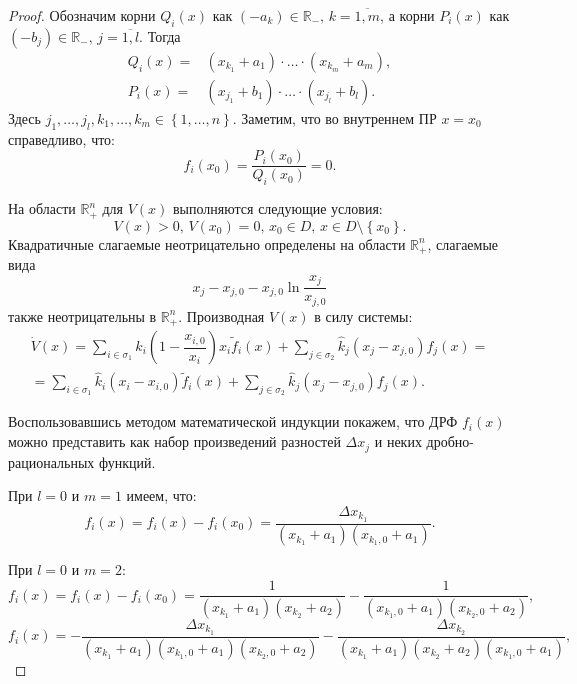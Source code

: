\documentclass[14pt,a4paper]{extarticle}
\begin{document}
	\begin{proof}
		Обозначим корни $Q_i(x)$ как $(-a_k)\in\mathbb{R}_{-},\, k=\overline{1,m}$, а корни $P_i(x)$ как $(-b_j)\in\mathbb{R}_{-},\, j=\overline{1,l}$. Тогда
		\begin{align*}
			Q_i(x)=&(x_{k_1}+a_1)\cdot\dots\cdot(x_{k_m}+a_m),\\
			P_i(x)=&(x_{j_1}+b_1)\cdot\dots\cdot(x_{j_l}+b_l).
		\end{align*}
		Здесь $j_1,\dots,j_l,k_1,\dots,k_m\in\left\{1,\dots,n\right\}$. Заметим, что во внутреннем ПР $x=x_0$ справедливо, что:
		\[f_i(x_0)=\dfrac{P_i(x_0)}{Q_i(x_0)}=0.\]
		
		На области $\mathbb{R}^n_{+}$ для $V(x)$ выполняются следующие условия:
		\[V(x)>0,\, V(x_0)=0,\, x_0\in D,\,x\in D\setminus\left\{x_0\right\}.\]
		Квадратичные слагаемые неотрицательно определены на области $\mathbb{R}^n_+$, слагаемые вида
		\[x_j-x_{j,0}-x_{j,0}\ln\dfrac{x_j}{x_{j,0}}\] 
		также неотрицательны в $\mathbb{R}^n_+$.
		Производная $V(x)$ в силу системы:
		\begin{multline*}
			\dot{V}(x)=\sum\limits_{i\in\sigma_1}\hat{k}_i\left(1-\dfrac{x_{i,0}}{x_i}\right)x_i\tilde{f}_i(x)+\sum\limits_{j\in\sigma_2}\hat{k}_j(x_j-x_{j,0})f_j(x)=\\
			=\sum\limits_{i\in\sigma_1}\hat{k}_i(x_i-x_{i,0})\tilde{f}_i(x)+\sum\limits_{j\in\sigma_2}\hat{k}_j(x_j-x_{j,0})f_j(x).
		\end{multline*}
		
		Воспользовавшись методом математической индукции покажем, что ДРФ $f_i(x)$ можно представить как набор произведений разностей $\Delta{}x_j$ и неких дробно-рациональных функций.
		
		При $l=0$ и $m=1$ имеем, что:
		\[f_i(x)=f_i(x)-f_i(x_0)=\dfrac{\Delta{}x_{k_1}}{(x_{k_1}+a_1)(x_{k_1,0}+a_1)}.\]
		
		При $l=0$ и $m=2$:
		\[f_i(x)=f_i(x)-f_i(x_0)=\dfrac{1}{(x_{k_1}+a_1)(x_{k_2}+a_2)}-\dfrac{1}{(x_{k_1,0}+a_1)(x_{k_2,0}+a_2)},\]
		\[f_i(x)=-\dfrac{\Delta{}x_{k_1}}{(x_{k_1}+a_1)(x_{k_1,0}+a_1)(x_{k_2,0}+a_2)}-\dfrac{\Delta{}x_{k_2}}{(x_{k_1}+a_1)(x_{k_2}+a_2)(x_{k_1,0}+a_1)},\]
		

\end{proof}
\end{document}
